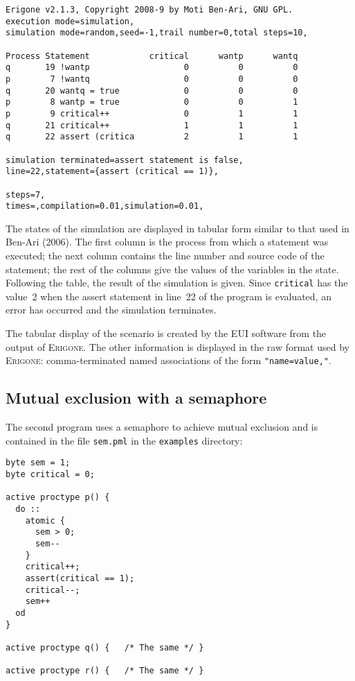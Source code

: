 \documentclass[11pt]{article}
\newcommand*{\prg}{\textsc{Erigone}}
\newcommand*{\eui}{\textsc{EUI}}
\newcommand*{\p}[1]{\texttt{#1}}
\begin{document}
\begin{verbatim}
Erigone v2.1.3, Copyright 2008-9 by Moti Ben-Ari, GNU GPL.
execution mode=simulation,
simulation mode=random,seed=-1,trail number=0,total steps=10,

Process Statement            critical      wantp      wantq 
q       19 !wantp                   0          0          0 
p        7 !wantq                   0          0          0 
q       20 wantq = true             0          0          0 
p        8 wantp = true             0          0          1 
p        9 critical++               0          1          1 
q       21 critical++               1          1          1 
q       22 assert (critica          2          1          1 

simulation terminated=assert statement is false,
line=22,statement={assert (critical == 1)},

steps=7,
times=,compilation=0.01,simulation=0.01,
\end{verbatim}

The states of the simulation are displayed in tabular form similar to
that used in Ben-Ari (2006). The first column is the process from which
a statement was executed; the next column contains the line number and
source code of the statement; the rest of the columns give the values of
the variables in the state. Following the table, the result of the
simulation is given. Since \p{critical} has the value~2 when the assert
statement in line~22 of the program is evaluated, an error has occurred
and the simulation terminates.

The tabular display of the scenario is created by the \eui{} software
from the output of \prg{}. The other information is displayed in the raw
format used by \prg{}: comma-terminated named associations of the form
\p{"name=value,"}.

\subsection*{Mutual exclusion with a semaphore}

The second program uses a semaphore to achieve mutual exclusion
and is contained in the file \p{sem.pml} in the \p{examples} directory:
\begin{verbatim}
byte sem = 1;
byte critical = 0;

active proctype p() {	
  do :: 
    atomic {
      sem > 0;
      sem--
    }
    critical++;
    assert(critical == 1);
    critical--;
    sem++
  od
}

active proctype q() {	/* The same */ }

active proctype r() {	/* The same */ }	
\end{verbatim}
\end{document}
